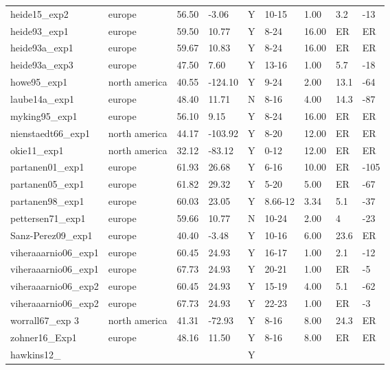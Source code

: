 \documentclass{article}
\begin{document}
\begin{table}[ht]
\begin{tabular}{|p{}|p{}|p{}|p{}|p{}|p{}|p{}|p{}|p{}|}
  heide15\_exp2 & europe & 56.50 & -3.06 & Y & 10-15 & 1.00 & 3.2 & -13 \\ 
  heide93\_exp1 & europe & 59.50 & 10.77 & Y & 8-24 & 16.00 & ER & ER \\ 
  heide93a\_exp1 & europe & 59.67 & 10.83 & Y & 8-24 & 16.00 & ER & ER \\ 
  heide93a\_exp3 & europe & 47.50 & 7.60 & Y & 13-16 & 1.00 & 5.7 & -18 \\ 
  howe95\_exp1 & north america & 40.55 & -124.10 & Y & 9-24 & 2.00 & 13.1 & -64 \\ 
  laube14a\_exp1 & europe & 48.40 & 11.71 & N & 8-16 & 4.00 & 14.3 & -87 \\ 
  myking95\_exp1 & europe & 56.10 & 9.15 & Y & 8-24 & 16.00 & ER & ER \\ 
  nienstaedt66\_exp1 & north america & 44.17 & -103.92 & Y & 8-20 & 12.00 & ER & ER \\ 
  okie11\_exp1 & north america & 32.12 & -83.12 & Y & 0-12 & 12.00 & ER & ER \\ 
  partanen01\_exp1 & europe & 61.93 & 26.68 & Y & 6-16 & 10.00 & ER & -105 \\ 
  partanen05\_exp1 & europe & 61.82 & 29.32 & Y & 5-20 & 5.00 & ER & -67 \\ 
  partanen98\_exp1 & europe & 60.03 & 23.05 & Y & 8.66-12 & 3.34 & 5.1 & -37 \\ 
  pettersen71\_exp1 & europe & 59.66 & 10.77 & N & 10-24 & 2.00 & 4 & -23 \\ 
  Sanz-Perez09\_exp1 & europe & 40.40 & -3.48 & Y & 10-16 & 6.00 & 23.6 & ER \\ 
  viheraaarnio06\_exp1 & europe & 60.45 & 24.93 & Y & 16-17 & 1.00 & 2.1 & -12 \\ 
  viheraaarnio06\_exp1 & europe & 67.73 & 24.93 & Y & 20-21 & 1.00 & ER & -5 \\ 
  viheraaarnio06\_exp2 & europe & 60.45 & 24.93 & Y & 15-19 & 4.00 & 5.1 & -62 \\ 
  viheraaarnio06\_exp2 & europe & 67.73 & 24.93 & Y & 22-23 & 1.00 & ER & -3 \\ 
  worrall67\_exp 3 & north america & 41.31 & -72.93 & Y & 8-16 & 8.00 & 24.3 & ER \\ 
  zohner16\_Exp1 & europe & 48.16 & 11.50 & Y & 8-16 & 8.00 & ER & ER \\ 
  hawkins12\_ &  &  &  & Y &  &  &  &  \\ 
   \hline
\end{tabular}
\end{table}\clearpage
\end{document}
